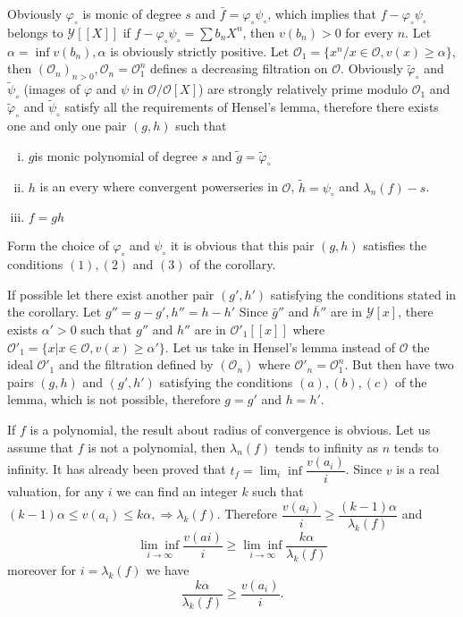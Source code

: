 Obviously $\varphi_\circ$ is monic of degree $s$ and $\bar{f}=
\varphi_{\circ} \psi_{\circ}$, which implies that $f - \varphi_\circ
\psi_\circ$ belongs to $\mathscr{Y}[[X]]$ \iec  if $f - \varphi_\circ
\psi_\circ = \sum b_n X^n$, then $v(b_n)>0$ for every $n$. Let $\alpha
= \inf v(b_n), \alpha$ is obviously strictly positive. Let
$\mathscr{O}_1 =\{x^n / x\in \mathscr{O}, v(x) \geq \alpha\}$, then
$(\mathscr{O}_n)_{n>0}, \mathscr{O}_n = \mathscr{O}^n_1$ defines a
decreasing filtration on $\mathscr{O}$. Obviously
$\tilde{\varphi}_\circ$ and $\tilde{\psi}_\circ$ (images of $\varphi$
and $\psi$ in $\mathscr{O}/\mathscr{O}[X]$) are strongly relatively
prime modulo $\mathscr{O}_1$ and $\tilde{\varphi}_\circ$ and
$\tilde{\psi}_\circ$ satisfy all the requirements of Hensel's lemma,
therefore there exists one and only one pair $(g, h)$ such that 
\begin{enumerate}[(i)]
\item $g$\pageoriginale is monic polynomial of degree $s$ and $\tilde{g}=
  \tilde{\varphi}_\circ$ 
\item $h$ is an every where convergent powerseries in $\mathscr{O}$,
  $\tilde{h}= \psi_\circ$ and $\lambda_n (f) -s$. 
\item $f= g h$
\end{enumerate}

Form the choice of $\varphi_\circ$ and $\psi_\circ$ it is obvious that
this pair $(g,  h)$ satisfies the conditions $(1),(2)$ and $(3)$ of
the corollary. 

If possible let there exist another pair $(g',  h')$ satisfying the
conditions stated in the corollary. Let $g'' = g - g', h'' = h-h'$ Since
$\bar{g}''$ and $\bar{h}''$ are in $\mathscr{Y}[x]$, there exists
$\alpha' > 0$ such that $g''$ and $h''$ are in $\mathscr{O}'_1[[x]]$ where
$\mathscr{O}'_1=\{x | x \in \mathscr{O}, v(x) \geq \alpha'\}$. Let us
take in Hensel's lemma instead of $\mathscr{O}$ the ideal
$\mathscr{O}'_1$ and the filtration defined by $(\mathscr{O}_n)$
where $\mathscr{O}'_n=\mathscr{O}^n_1$. But then have two pairs $(g,
h)$ and $(g',  h')$ satisfying the conditions $(a),(b),(c)$ of the
lemma, which is not possible, therefore $g=g'$ and $h=h'$. 

If $f$ is a polynomial,  the result about radius of convergence is
obvious. Let us assume that $f$ is not a polynomial, then $\lambda_n
(f)$ tends to infinity as $n$ tends to infinity. It has  already been
proved that $t_f = \lim_i \inf \dfrac{v(a_i)}{i}$. Since $v$ is a real
valuation, for any $i$ we can find an integer $k$ such that$ (k-1)
\alpha \leq v(a_i) \leq k \alpha,  \Longrightarrow \lambda_k
(f)$. Therefore $\dfrac{v(a_i)}{i} \geq \dfrac{(k-1)\alpha}{\lambda_k
  (f)}$ and 
$$
\underset{i \to \infty}{\lim\inf} \frac{v(ai)}{i} \geq \underset{i \to
  \infty}{\lim\inf} 
\frac{k \alpha}{\lambda_k (f)} 
$$\pageoriginale
moreover for $i=\lambda_k (f)$ we have
$$
\frac{k \alpha}{\lambda_k (f)}\geq \frac{v(a_i)}{i}.
$$

